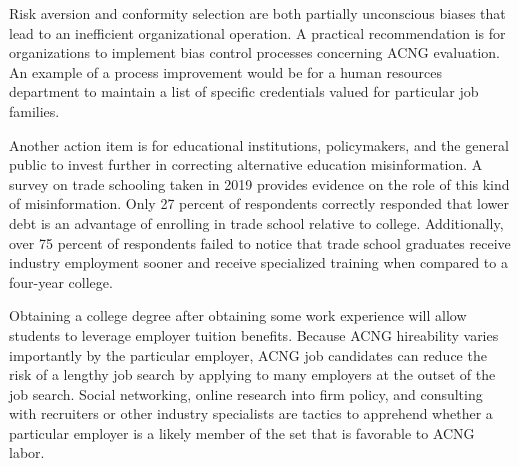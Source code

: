 \documentclass[review]{elsarticle}
\begin{document}
Risk aversion and conformity selection are both partially unconscious biases that lead to an inefficient organizational operation.
A practical recommendation is for organizations to implement bias control processes concerning ACNG evaluation.
An example of a process improvement would be for a human resources department
to maintain a list of specific credentials valued for particular job families.

Another action item is for educational institutions, policymakers, and the general public to invest further in correcting alternative education misinformation.
A survey on trade schooling taken in 2019 provides evidence on the role of this kind of misinformation\cite{arabia_2019}.
Only 27 percent of respondents correctly responded that lower debt is an advantage of enrolling in trade school relative to college.
Additionally, over 75 percent of respondents failed to notice that trade school graduates receive industry employment sooner
and receive specialized training when compared to a four-year college.

Obtaining a college degree after obtaining some work experience will allow students to leverage employer tuition benefits.
Because ACNG hireability varies importantly by the particular employer, ACNG job candidates can reduce the risk of a lengthy job search by applying to many employers at the outset of the job search.
Social networking, online research into firm policy, and consulting with recruiters or other industry specialists are tactics to apprehend whether a particular employer is a likely member of the set that is favorable to ACNG labor.

\end{document}
